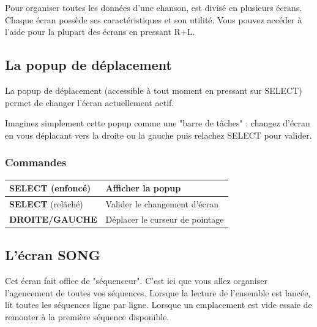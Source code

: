 \documentclass[12pt,a4paper]{article}
\begin{document}
    Pour organiser toutes les données d'une chanson, \FAT est divisé en plusieurs écrans.
    Chaque écran possède ses caractéristiques et son utilité.
    Vous pouvez accéder à l'aide pour la plupart des écrans en pressant R+L.
  
    \subsection{La popup de déplacement}
    
    La popup de déplacement (accessible à tout moment en pressant sur SELECT) permet de changer l'écran actuellement actif. 
    
    
    Imaginez simplement cette popup comme une "barre de tâches" : changez d'écran en vous déplacant vers la droite ou la gauche puis relachez SELECT pour valider.
    
    \subsubsection{Commandes}

    \tablelasttail{\hline}
    \begin{supertabular}{|l|l|}
    \hline
        {\bf SELECT} (enfoncé) & Afficher la popup \\
        \hline
        {\bf SELECT} (relâché) & Valider le changement d'écran \\
        \hline
        {\bf DROITE/GAUCHE} & Déplacer le curseur de pointage \\
    \hline
    \end{supertabular}
  
    \subsection{L'écran SONG}
    
    Cet écran fait office de "séquenceur".
    C'est ici que vous allez organiser l'agencement de toutes vos séquences.
    Lorsque la lecture de l'ensemble est lancée, \FAT lit toutes les séquences ligne par ligne.
    Lorsque un emplacement est vide \FAT essaie de remonter à la première séquence disponible.
    
\end{document}

